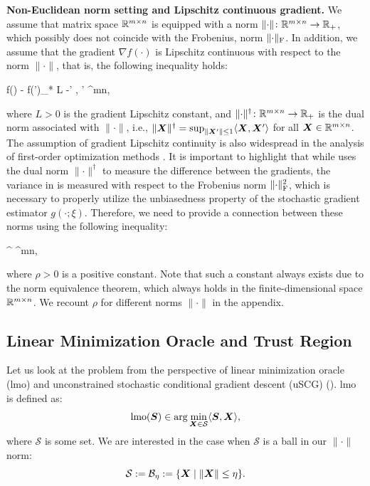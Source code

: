 \documentclass{article} %
\newcommand{\norm}[1]{\lVert #1\rVert}
\newcommand{\Rmn}{\R^{m\times n}}
\newcommand{\cS}{\mathcal{S}}
\newcommand{\cB}{\mathcal{B}}
\DeclarePairedDelimiter{\normf}{\|}{\|_\mathrm{F}}
\DeclarePairedDelimiter{\sqnf}{\|}{\|_{\mathrm{F}}^2}
\def\<#1,#2>{\langle #1,#2\rangle}
\newcounter{aequation}
\begin{document}
{\bf Non-Euclidean norm setting and Lipschitz continuous gradient.}
We assume that matrix space $\Rmn$ is equipped with a norm $\norm{\cdot}\colon \Rmn \to \R_+$, which possibly does not coincide with the Frobenius, norm $\normf{\cdot}$. In addition, we assume that the gradient $\nabla f(\cdot)$ is Lipschitz continuous with respect to the norm $\norm{\cdot}$, that is, the following inequality holds:
\begin{aequation}\label{eq:L}
  \norm{\nabla f(\mX) - \nabla f(\mX')}_* \leq L \norm{\mX-\mX'}
  \quad{}\;
  \mX, \mX' \in \Rmn,
\end{aequation}
where $L > 0$ is the gradient Lipschitz constant, and $\norm{\cdot}^\dagger\colon \Rmn \to \R_+$ is the dual norm associated with $\norm{\cdot}$, i.e., $\norm{\mX}^\dagger = \sup_{\norm{\mX'}\leq 1} \<\mX,\mX'>$ for all $\mX \in \Rmn$. The assumption of gradient Lipschitz continuity is also widespread in the analysis of first-order optimization methods \citep{ghadimi2013stochastic,gower2019sgd,cutkosky2020momentum,horvath2023stochastic,gorbunov2020linearly}. It is important to highlight that while  uses the dual norm $\norm{\cdot}^\dagger$ to measure the difference between the gradients, the variance in  is measured with respect to the Frobenius norm $\sqnf{\cdot}$, which is necessary to properly utilize the unbiasedness property of the stochastic gradient estimator $g(\cdot;\xi)$. Therefore, we need to provide a connection between these norms using the following inequality:
\begin{aequation}\label{eq:norm}
  \norm{\mX}^\dagger \leq \rho\cdot\normf{\mX}
  \quad{}\;
  \mX \in \Rmn,
\end{aequation}
where $\rho > 0$ is a positive constant. Note that such a constant always exists due to the norm equivalence theorem, which always holds in the finite-dimensional space $\Rmn$. We recount $\rho$ for different norms $\norm{\cdot}$ in the appendix.


\subsection{Linear Minimization Oracle and Trust Region}
Let us look at the problem from the perspective of linear minimization oracle (lmo) and unconstrained stochastic conditional gradient descent (uSCG) (\cite{pethick2025training}). lmo is defined as:
\begin{equation}\label{eq:lmo}
    \mathrm{lmo}(\mS) \in \arg\min_{\mX \in \cS} \<\mS, \mX>,
\end{equation}
where $\cS$ is some set. We are interested in the case when $\cS$ is a ball in our $\norm{\cdot}$ norm:
\begin{equation}\label{eq:ball}
    \cS := \cB_\eta :=\{ \mX \mid \norm{\mX} \leq \eta \}.
\end{equation}
\end{document}
